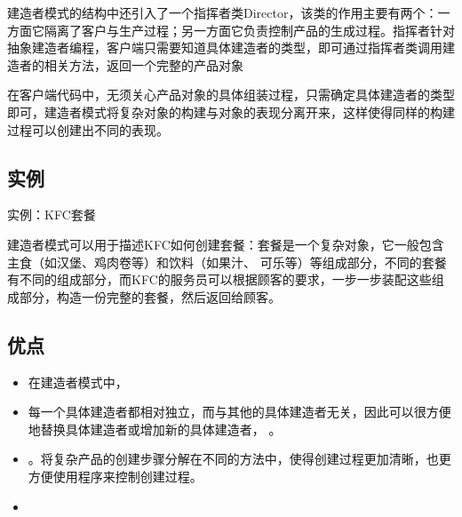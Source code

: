 \documentclass[letterpaper,10pt,english]{sphinxmanual}
\begin{document}
\sphinxAtStartPar
建造者模式的结构中还引入了一个指挥者类Director，该类的作用主要有两个：一方面它隔离了客户与生产过程；另一方面它负责控制产品的生成过程。指挥者针对抽象建造者编程，客户端只需要知道具体建造者的类型，即可通过指挥者类调用建造者的相关方法，返回一个完整的产品对象

\sphinxAtStartPar
在客户端代码中，无须关心产品对象的具体组装过程，只需确定具体建造者的类型即可，建造者模式将复杂对象的构建与对象的表现分离开来，这样使得同样的构建过程可以创建出不同的表现。


\subsection{实例}
\label{\detokenize{creational_patterns/builder:id9}}
\sphinxAtStartPar
实例：KFC套餐

\sphinxAtStartPar
建造者模式可以用于描述KFC如何创建套餐：套餐是一个复杂对象，它一般包含主食（如汉堡、鸡肉卷等）和饮料（如果汁、
可乐等）等组成部分，不同的套餐有不同的组成部分，而KFC的服务员可以根据顾客的要求，一步一步装配这些组成部分，构造一份完整的套餐，然后返回给顾客。

\noindent{}


\subsection{优点}
\label{\detokenize{creational_patterns/builder:id10}}\begin{itemize}
\item {} 
\sphinxAtStartPar
在建造者模式中， 

\item {} 
\sphinxAtStartPar
每一个具体建造者都相对独立，而与其他的具体建造者无关，因此可以很方便地替换具体建造者或增加新的具体建造者，  。

\item {} 
\sphinxAtStartPar
{} 。将复杂产品的创建步骤分解在不同的方法中，使得创建过程更加清晰，也更方便使用程序来控制创建过程。

\item {} 
\sphinxAtStartPar
{}

\end{itemize}
\end{document}
